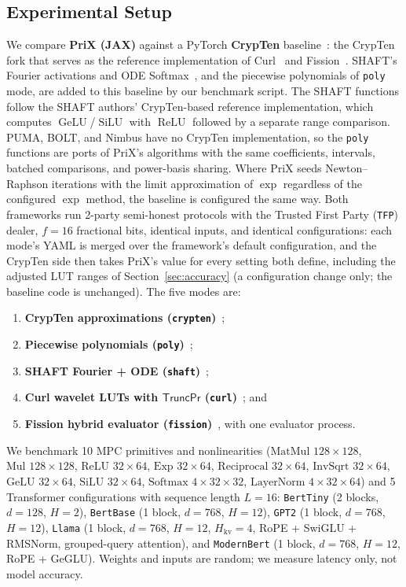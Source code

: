 \documentclass[11pt]{article}
\begin{document}
\subsection{Experimental Setup}
We compare \textbf{PriX (JAX)} against a PyTorch \textbf{CrypTen} baseline~\cite{knott2021crypten}: the CrypTen fork that serves as the reference implementation of Curl~\cite{santos2024curl} and Fission~\cite{ugurbil2025fission}. SHAFT's Fourier activations and ODE Softmax~\cite{kei2025shaft}, and the piecewise polynomials of \texttt{poly} mode, are added to this baseline by our benchmark script. The SHAFT functions follow the SHAFT authors' CrypTen-based reference implementation, which computes $\operatorname{GeLU}$/$\operatorname{SiLU}$ with $\operatorname{ReLU}$ followed by a separate range comparison. PUMA, BOLT, and Nimbus have no CrypTen implementation, so the \texttt{poly} functions are ports of PriX's algorithms with the same coefficients, intervals, batched comparisons, and power-basis sharing. Where PriX seeds Newton--Raphson iterations with the limit approximation of $\exp$ regardless of the configured $\exp$ method, the baseline is configured the same way. Both frameworks run 2-party semi-honest protocols with the Trusted First Party (\texttt{TFP}) dealer, $f = 16$ fractional bits, identical inputs, and identical configurations: each mode's YAML is merged over the framework's default configuration, and the CrypTen side then takes PriX's value for every setting both define, including the adjusted LUT ranges of Section~\ref{sec:accuracy} (a configuration change only; the baseline code is unchanged). The five modes are:
\begin{enumerate}
    \item \textbf{CrypTen approximations (\texttt{crypten})}~\cite{knott2021crypten};
    \item \textbf{Piecewise polynomials (\texttt{poly})}~\cite{dong2023puma,pang2024bolt,li2024nimbus};
    \item \textbf{SHAFT Fourier + ODE (\texttt{shaft})}~\cite{kei2025shaft};
    \item \textbf{Curl wavelet LUTs with $\mathsf{TruncPr}$ (\texttt{curl})}~\cite{santos2024curl}; and
    \item \textbf{Fission hybrid evaluator (\texttt{fission})}~\cite{ugurbil2025fission}, with one evaluator process.
\end{enumerate}
We benchmark 10 MPC primitives and nonlinearities ($\text{MatMul } 128\times 128$, $\text{Mul } 128\times 128$, $\text{ReLU } 32\times 64$, $\text{Exp } 32\times 64$, $\text{Reciprocal } 32\times 64$, $\text{InvSqrt } 32\times 64$, $\text{GeLU } 32\times 64$, $\text{SiLU } 32\times 64$, $\text{Softmax } 4\times 32\times 32$, $\text{LayerNorm } 4\times 32\times 64$) and 5 Transformer configurations with sequence length $L=16$: \texttt{BertTiny} (2 blocks, $d=128$, $H=2$), \texttt{BertBase} (1 block, $d=768$, $H=12$), \texttt{GPT2} (1 block, $d=768$, $H=12$), \texttt{Llama} (1 block, $d=768$, $H=12$, $H_{\text{kv}}=4$, RoPE + SwiGLU + RMSNorm, grouped-query attention), and \texttt{ModernBert} (1 block, $d=768$, $H=12$, RoPE + GeGLU). Weights and inputs are random; we measure latency only, not model accuracy.
\end{document}
